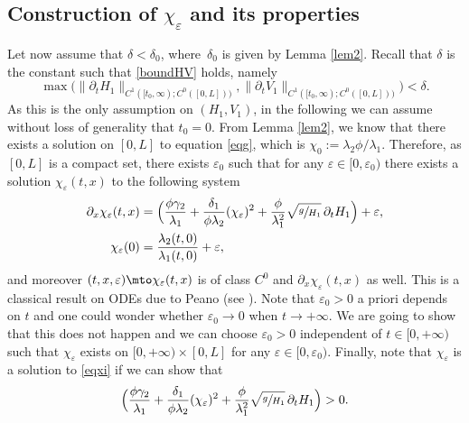 \subsection{Construction of $\chi_{\varepsilon}$ and its properties}
Let now assume that $\delta \!<\!\delta_{0}$, where~$\delta_{0}$ is given by Lemma \ref{lem2}. {Recall that $\delta$ is the constant such that \eqref{boundHV} holds, namely
\begin{equation*}
\max\bigl(\lVert\partial_{t}H_{1}\rVert_{C^{1}([t_{0},\infty);{C^{0}([0,L])})},\lVert\partial_{t}V_{1}\rVert_{C^{1}([t_{0},\infty);{C^{0}([0,L])})}\bigr)<\delta.
\end{equation*}
As this is the only assumption on $(H_{1},V_{1})$, in the following we can assume without loss of generality that $t_{0}=0$.}
From Lemma \ref{lem2}, we know that there exists a solution on $[0,L]$ to equation \eqref{eqg}, which is ${\chi_{0}:=}\lambda_{2}\phi/\lambda_{1}$.
Therefore, as $[0,L]$ is a compact set, there exists $\varepsilon_{{0}}$ such that
for any $\varepsilon\in[0,\varepsilon_{{0}})$ there exists a solution $\chi_{\varepsilon}(t,x)$ to the following system
\begin{equation}
\begin{split}
\partial_{x}\chi_{\varepsilon}(t,x)&=\Bigl(\frac{\phi\gamma_{2}}{\lambda_{1}}+\frac{\delta_{1}}{\phi\lambda_{2}}(\chi_{\varepsilon})^{2}+{\frac{\phi}{\lambda_{1}^{2}}}\sqrt{\sfrac{g}{H_{1}}}\,\partial_{t} H_{1} \Bigr)+\varepsilon,\\
\chi_{\varepsilon}(0)&=\frac{\lambda_{2}(t,0)}{\lambda_{1}(t,0)}+\varepsilon,
\end{split}
\label{eqf}
\end{equation}
and moreover $(t,x,\varepsilon)\mto \chi_{\varepsilon}(t,x)$ is of class $C^{0}$ and $\partial_{x}\chi_{\varepsilon}(t,x)$ as well.
This is a classical result on {ODEs} due to Peano (see \eg \cite[Chap.\,5, Th.\,3.1]{Hartman}). Note that $\varepsilon_{0}>0$ a priori depends on $t$ and one could wonder whether $\varepsilon_{0}\to 0$ when $t\to+\infty$. We are going to show that this does not happen and we can choose $\varepsilon_{0}>0$ independent of $t\in[0,+\infty)$ such that $\chi_{\varepsilon}$ exists on $[0,+\infty)\times[0,L]$ for any $\varepsilon\in[0,\varepsilon_{0})$. Finally, note that $\chi_{\varepsilon}$ is a solution to \eqref{eqxi} if we can show that
\begin{equation*}
\Bigl(\frac{\phi\gamma_{2}}{\lambda_{1}}+\frac{\delta_{1}}{\phi\lambda_{2}}(\chi_{\varepsilon})^{2}+{\frac{\phi}{\lambda_{1}^{2}}}\sqrt{\sfrac{g}{H_{1}}}\,\partial_{t} H_{1} \Bigr)>0.
\end{equation*}
